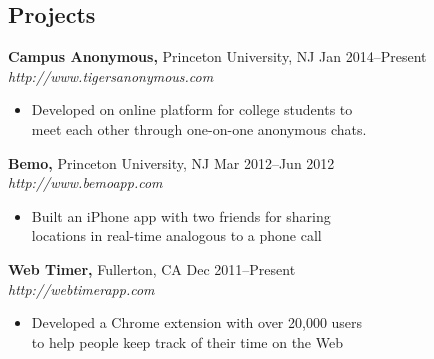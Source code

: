 \documentclass[margin]{res}
\begin{document}
\begin{resume}

\section{Projects}
 {\bf Campus Anonymous,} Princeton University, NJ \hfill Jan 2014--Present
 {\it http://www.tigersanonymous.com}
 \begin{itemize} \itemsep -2pt  %
 \item Developed on online platform for college students to \\
   meet each other through one-on-one anonymous chats.
 \end{itemize}

 {\bf Bemo,} Princeton University, NJ \hfill Mar 2012--Jun 2012 \\
 {\it http://www.bemoapp.com}
 \begin{itemize} \itemsep -2pt  %
 \item Built an iPhone app with two friends for sharing \\
   locations in real-time analogous to a phone call
 \end{itemize}


 {\bf Web Timer,} Fullerton, CA \hfill Dec 2011--Present \\
 {\it http://webtimerapp.com}
 \begin{itemize} \itemsep -2pt  %
 \item Developed a Chrome extension with over 20,000 users \\
   to help people keep track of their time on the Web
 \end{itemize}


\end{resume}
\end{document}

